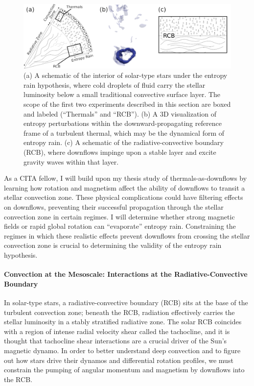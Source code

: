 \documentclass[preprint, hmargin=1in, vmargin=1in]{aastex62}
\begin{document}
\begin{figure}[t]
    \includegraphics[width=\textwidth]{./figs/tri_panel.png}
    \caption{ (a) A schematic of the interior of solar-type stars under the entropy rain hypothesis, where cold droplets of fluid carry the stellar luminosity below a small traditional convective surface layer.
	The scope of the first two experiments described in this section are boxed and labeled (``Thermals'' and ``RCB'').
	(b) A 3D visualization of entropy perturbations within the downward-propagating reference frame of a turbulent thermal, which may be the dynamical form of entropy rain.
	(c) A schematic of the radiative-convective boundary (RCB), where downflows impinge upon a stable layer and excite gravity waves within that layer.
	\label{fig:tri_panel} }
\end{figure}

As a CITA fellow, I will build upon my thesis study of thermals-as-downflows \citep{andersLB2019} by learning how rotation and magnetism affect the ability of downflows to transit a stellar convection zone.
These physical complications could have filtering effects on downflows, preventing their successful propagation through the stellar convection zone in certain regimes.
I will determine whether strong magnetic fields or rapid global rotation can ``evaporate'' entropy rain.
Constraining the regimes in which these realistic effects prevent downflows from crossing the stellar convection zone is crucial to determining the validity of the entropy rain hypothesis.

\paragraph{Convection at the Mesoscale: Interactions at the Radiative-Convective Boundary}
In solar-type stars, a radiative-convective boundary (RCB) sits at the base of the turbulent convection zone; beneath the RCB, radiation effectively carries the stellar luminosity in a stably stratified radiative zone.
The solar RCB coincides with a region of intense radial velocity shear called the tachocline, and it is thought that tachocline shear interactions are a crucial driver of the Sun's magnetic dynamo.
In order to better understand deep convection and to figure out how stars drive their dynamos and differential rotation profiles, we must constrain the pumping of angular momentum and magnetism by downflows into the RCB.
\end{document}
